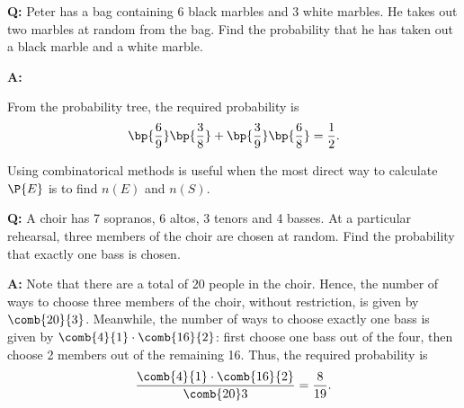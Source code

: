 \begin{example}
    \phantom{.}

    \textbf{Q:} Peter has a bag containing 6 black marbles and 3 white marbles. He takes out two marbles at random from the bag. Find the probability that he has taken out a black marble and a white marble.

    \textbf{A:}
    \begin{center}
    \end{center}
    From the probability tree, the required probability is \[\bp{\frac69}\bp{\frac38} + \bp{\frac39}\bp{\frac68} = \frac12.\]
\end{example}

\begin{method}
    Using combinatorical methods is useful when the most direct way to calculate $\P{E}$ is to find $n(E)$ and $n(S)$.
\end{method}

\begin{example}
    \phantom{.}

    \textbf{Q:} A choir has 7 sopranos, 6 altos, 3 tenors and 4 basses. At a particular rehearsal, three members of the choir are chosen at random. Find the probability that exactly one bass is chosen.

    \textbf{A:} Note that there are a total of 20 people in the choir. Hence, the number of ways to choose three members of the choir, without restriction, is given by $\comb{20}{3}$. Meanwhile, the number of ways to choose exactly one bass is given by $\comb{4}{1} \cdot \comb{16}{2}$: first choose one bass out of the four, then choose 2 members out of the remaining 16. Thus, the required probability is \[\frac{\comb{4}{1} \cdot \comb{16}{2}}{\comb{20}3} = \frac8{19}.\]
\end{example}